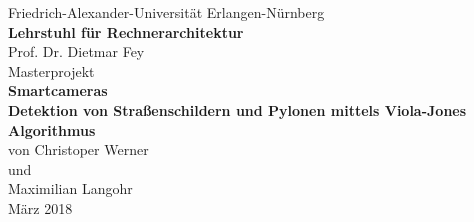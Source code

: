 \documentclass[12pt,twoside]{report}
\renewcommand{\chaptermark}[1]{\markboth{\uppercase{\chaptername \ \thechapter.\ #1}}{}}
\begin{document}

\begin{titlepage}
\begin{center}
\vspace*{-1cm}
 {\LARGE Friedrich-Alexander-Universität Erlangen-Nürnberg}\\
\vspace{1cm}  
 {\Large \textbf{Lehrstuhl für Rechnerarchitektur}}\\
\vspace{1cm}  
 {\Large Prof. Dr. Dietmar Fey}\\
\vspace{3cm}  
 {\LARGE Masterprojekt}\\
\vspace{2cm}  
 {\LARGE \textbf{Smartcameras\\ Detektion von Straßenschildern und Pylonen mittels Viola-Jones Algorithmus}}\\
\vspace{2cm} 
{\LARGE von Christoper Werner\\und \\ Maximilian Langohr}\\
\vspace{3cm} 
{\Large März 2018}\\
\vspace{1cm} 
{\Large }

\end{center}
\end{titlepage}







\addtocounter{page}{-2}
\tableofcontents   
\clearpage


%

%

\end{document}
